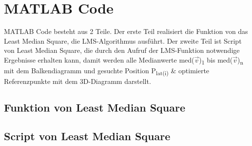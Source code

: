 \section{MATLAB Code}
MATLAB Code besteht aus 2 Teile. 
Der erste Teil realisiert die Funktion von das Least Median Square, die LMS-Algorithmus ausführt.
Der zweite Teil ist Script von Least Median Square, die durch den Aufruf der LMS-Funktion notwendige Ergebnisse erhalten kann, damit werden alle Medianwerte med($\vec{v}$)\textsubscript{1} bis med($\vec{v}$)\textsubscript{n} mit dem Balkendiagramm und gesuchte Position P\textsubscript{lat(i)} \& optimierte Referenzpunkte mit dem 3D-Diagramm darstellt.

\subsection{Funktion von Least Median Square}

\subsection{Script von Least Median Square}
 
